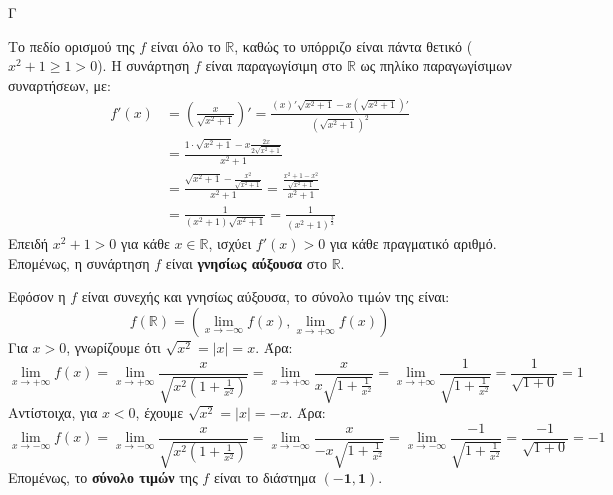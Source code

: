 \begin{thema}{Γ}
\begin{erwthma}
\item Το πεδίο ορισμού της $f$ είναι όλο το $\mathbb{R}$, καθώς το υπόρριζο είναι πάντα θετικό ($x^2+1 \ge 1 > 0$).
Η συνάρτηση $f$ είναι παραγωγίσιμη στο $\mathbb{R}$ ως πηλίκο παραγωγίσιμων συναρτήσεων, με:
\begin{align*}
f'(x) &= \left( \frac{x}{\sqrt{x^2+1}} \right)' = \frac{(x)' \sqrt{x^2+1} - x (\sqrt{x^2+1})'}{(\sqrt{x^2+1})^2} \\
&= \frac{1 \cdot \sqrt{x^2+1} - x \frac{2x}{2\sqrt{x^2+1}}}{x^2+1} \\
&= \frac{\sqrt{x^2+1} - \frac{x^2}{\sqrt{x^2+1}}}{x^2+1} = \frac{\frac{x^2+1-x^2}{\sqrt{x^2+1}}}{x^2+1} \\
&= \frac{1}{(x^2+1)\sqrt{x^2+1}} = \frac{1}{(x^2+1)^{\frac{3}{2}}}
\end{align*}
Επειδή $x^2+1 > 0$ για κάθε $x \in \mathbb{R}$, ισχύει $f'(x) > 0$ για κάθε πραγματικό αριθμό.
Επομένως, η συνάρτηση $f$ είναι \textbf{γνησίως αύξουσα} στο $\mathbb{R}$.

Εφόσον η $f$ είναι συνεχής και γνησίως αύξουσα, το σύνολο τιμών της είναι:
\[ f(\mathbb{R}) = \left( \lim_{x \to -\infty} f(x), \lim_{x \to +\infty} f(x) \right) \]
Για $x > 0$, γνωρίζουμε ότι $\sqrt{x^2} = |x| = x$. Άρα:
\[ \lim_{x \to +\infty} f(x) = \lim_{x \to +\infty} \frac{x}{\sqrt{x^2\left(1+\frac{1}{x^2}\right)}} = \lim_{x \to +\infty} \frac{x}{x\sqrt{1+\frac{1}{x^2}}} = \lim_{x \to +\infty} \frac{1}{\sqrt{1+\frac{1}{x^2}}} = \frac{1}{\sqrt{1+0}} = 1 \]
Αντίστοιχα, για $x < 0$, έχουμε $\sqrt{x^2} = |x| = -x$. Άρα:
\[ \lim_{x \to -\infty} f(x) = \lim_{x \to -\infty} \frac{x}{\sqrt{x^2\left(1+\frac{1}{x^2}\right)}} = \lim_{x \to -\infty} \frac{x}{-x\sqrt{1+\frac{1}{x^2}}} = \lim_{x \to -\infty} \frac{-1}{\sqrt{1+\frac{1}{x^2}}} = \frac{-1}{\sqrt{1+0}} = -1 \]
Επομένως, το \textbf{σύνολο τιμών} της $f$ είναι το διάστημα $\boldsymbol{(-1, 1)}$.


\end{erwthma}
\end{thema}
